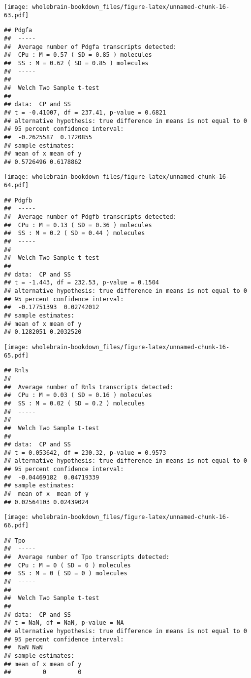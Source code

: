 \documentclass[]{book}
\theoremstyle{definition}
\theoremstyle{definition}
\theoremstyle{remark}
\begin{document}
\texttt{[image: wholebrain-bookdown\_files/figure-latex/unnamed-chunk-16-63.pdf]}

\begin{verbatim}
## Pdgfa
##  -----
##  Average number of Pdgfa transcripts detected:
##  CPu : M = 0.57 ( SD = 0.85 ) molecules 
##  SS : M = 0.62 ( SD = 0.85 ) molecules
##  -----
## 
##  Welch Two Sample t-test
## 
## data:  CP and SS
## t = -0.41007, df = 237.41, p-value = 0.6821
## alternative hypothesis: true difference in means is not equal to 0
## 95 percent confidence interval:
##  -0.2625587  0.1720855
## sample estimates:
## mean of x mean of y 
## 0.5726496 0.6178862
\end{verbatim}

\texttt{[image: wholebrain-bookdown\_files/figure-latex/unnamed-chunk-16-64.pdf]}

\begin{verbatim}
## Pdgfb
##  -----
##  Average number of Pdgfb transcripts detected:
##  CPu : M = 0.13 ( SD = 0.36 ) molecules 
##  SS : M = 0.2 ( SD = 0.44 ) molecules
##  -----
## 
##  Welch Two Sample t-test
## 
## data:  CP and SS
## t = -1.443, df = 232.53, p-value = 0.1504
## alternative hypothesis: true difference in means is not equal to 0
## 95 percent confidence interval:
##  -0.17751393  0.02742012
## sample estimates:
## mean of x mean of y 
## 0.1282051 0.2032520
\end{verbatim}

\texttt{[image: wholebrain-bookdown\_files/figure-latex/unnamed-chunk-16-65.pdf]}

\begin{verbatim}
## Rnls
##  -----
##  Average number of Rnls transcripts detected:
##  CPu : M = 0.03 ( SD = 0.16 ) molecules 
##  SS : M = 0.02 ( SD = 0.2 ) molecules
##  -----
## 
##  Welch Two Sample t-test
## 
## data:  CP and SS
## t = 0.053642, df = 230.32, p-value = 0.9573
## alternative hypothesis: true difference in means is not equal to 0
## 95 percent confidence interval:
##  -0.04469182  0.04719339
## sample estimates:
##  mean of x  mean of y 
## 0.02564103 0.02439024
\end{verbatim}

\texttt{[image: wholebrain-bookdown\_files/figure-latex/unnamed-chunk-16-66.pdf]}

\begin{verbatim}
## Tpo
##  -----
##  Average number of Tpo transcripts detected:
##  CPu : M = 0 ( SD = 0 ) molecules 
##  SS : M = 0 ( SD = 0 ) molecules
##  -----
## 
##  Welch Two Sample t-test
## 
## data:  CP and SS
## t = NaN, df = NaN, p-value = NA
## alternative hypothesis: true difference in means is not equal to 0
## 95 percent confidence interval:
##  NaN NaN
## sample estimates:
## mean of x mean of y 
##         0         0
\end{verbatim}
\end{document}

